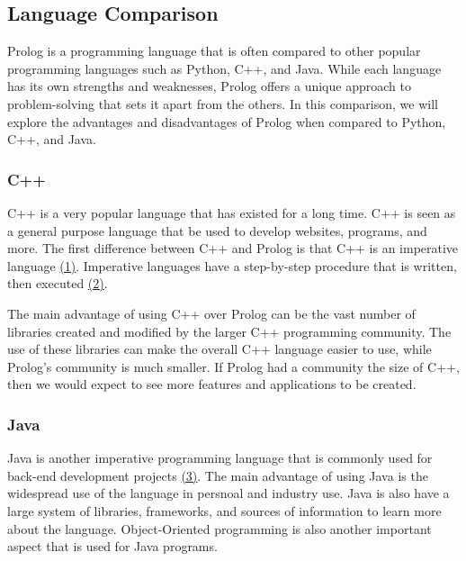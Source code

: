 \documentclass{article}
\theoremstyle{theorem}
\theoremstyle{definition}
\theoremstyle{remark}
\begin{document}
\subsection{Language Comparison}
Prolog is a programming language that is often compared to other popular programming languages such as Python, C++, and Java. While each language has its own strengths and weaknesses, Prolog offers a unique approach to problem-solving that sets it apart from the others. In this comparison, we will explore the advantages and disadvantages of Prolog when compared to Python, C++, and Java.

\subsubsection{C++}
\noindent\newline C++ is a very popular language that has existed for a long time. C++ is seen as a general purpose language that be used to develop websites, programs, and more. The first difference between C++ and Prolog is that C++ is an imperative language \href{https://icarus.cs.weber.edu/~dab/cs1410/textbook/1.Basics/programs.html}{(1)}. Imperative languages have a step-by-step procedure that is written, then executed \href{https://www.educative.io/blog/declarative-vs-imperative-programming}{(2)}. 

\noindent\newline The main advantage of using C++ over Prolog can be the vast number of libraries created and modified by the larger C++ programming community. The use of these libraries can make the overall C++ language easier to use, while Prolog's community is much smaller. If Prolog had a community the size of C++, then we would expect to see more features and applications to be created. 


\subsubsection{Java}
\noindent\newline Java is another imperative programming language that is commonly used for back-end development projects \href{https://blogs.oracle.com/oracleuniversity/post/why-does-java-remain-so-popular}{(3)}. The main advantage of using Java is the widespread use of the language in persnoal and industry use. Java is also have a large system of libraries, frameworks, and sources of information to learn more about the language. Object-Oriented programming is also another important aspect that is used for Java programs.
\end{document}

